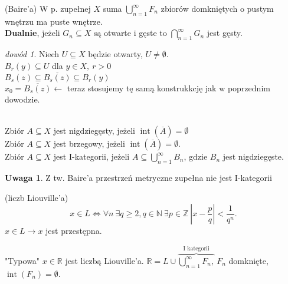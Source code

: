 \documentclass[twoside,10pt]{article}
\theoremstyle{definition}
\theoremstyle{definition}
\theoremstyle{definition}
\theoremstyle{definition}
\theoremstyle{remark}
\newtheorem*{dd}{dowód}
\theoremstyle{definition}
\newtheorem*{uw}{Uwaga}
\theoremstyle{definition}
\theoremstyle{definition}
\theoremstyle{definition}
\theoremstyle{definition}
\theoremstyle{definition}
\begin{document}
\begin{tw} (Baire'a) W p. zupełnej $X$ suma $\bigcup\limits_{n=1}^\infty F_n$ zbiorów domkniętych o pustym wnętrzu ma puste wnętrze. \\ 
    \textbf{Dualnie}, jeżeli $G_n \subseteq X$ są otwarte i gęste to $\bigcap\limits_{n=1}^\infty G_n$ jest gęsty.
\end{tw} 
\begin{dd} 
    Niech $U \subseteq X$ będzie otwarty, $U \neq \emptyset$. \\ 
    $B_r(y) \subseteq U$ dla $y \in X,\ r > 0$ \\
    $B_s(z) \subseteq \overline{B_s(z)} \subseteq B_r(y)$ \\ 
    $x_0 = \overline{B_s(z)} \leftarrow$ teraz stosujemy tę samą konstrukkcję jak w poprzednim dowodzie.
\end{dd} 
\begin{df} ~\\
    Zbiór $ A \subseteq X$ jest nigdziegęsty, jeżeli $\operatorname{int}(\overline{A}) = \emptyset$ \\
    Zbiór $A \subseteq X$ jest brzegowy, jeżeli $\operatorname{int}(\overline{A}) = \emptyset$. \\ 
    Zbiór $A \subseteq X$ jest I-kategorii, jeżeli $A \subseteq \bigcup\limits_{n=1}^\infty B_n$, gdzie $B_n$ jest nigdziegęste.
\end{df} 
\begin{uw} Z tw. Baire'a przestrzeń metryczne zupełna nie jest I-kategorii \end{uw}
\begin{df} (liczb Liouville'a)
    $$ x \in L \Leftrightarrow \forall n \ \exists q \ge 2, q \in \mathbb{N} \ \exists p \in \mathbb{Z} \ |x - \frac{p}{q}| < \frac{1}{q^n}. $$
    $x \in L \rightarrow x$ jest przestępna. \end{df}
    "Typowa" $x \in \mathbb{R}$ jest liczbą Liouville'a. $\mathbb{R} = L \cup \overbrace{\bigcup\limits_{n=1}^\infty F_n,}^{\text{I kategorii}} \ F_n$
    domknięte, $\operatorname{int}(F_n) = \emptyset$. 
\end{document}
